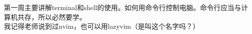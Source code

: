 \documentclass{article}
\begin{document}
第一周主要讲解terminal和shell的使用。如何用命令行控制电脑。命令行应当与计算机共存，所以必然要学。\\
我记得老师说到过nvim，也可以用lazyvim（是叫这个名字吗？）
\end{document}
